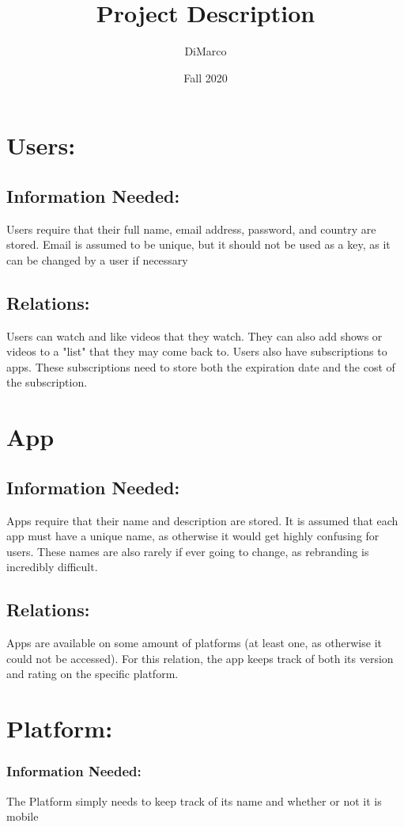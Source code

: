 \documentclass{neu_handout}
\title{Project Description}
\author{DiMarco}
\date{Fall 2020}
\begin{document}
\section{Users:}

\subsection{Information Needed:}
Users require that their full name, email address, password, and country are stored. Email is assumed to be unique, but it should not be used as a key, as it can be changed by a user if necessary

\subsection{Relations:}
Users can watch and like videos that they watch. They can also add shows or videos to a "list" that they may come back to. Users also have subscriptions to apps. These subscriptions need to store both the expiration date and the cost of the subscription.


\section{App}

\subsection{Information Needed:}
Apps require that their name and description are stored. It is assumed that each app must have a unique name, as otherwise it would get highly confusing for users. These names are also rarely if ever going to change, as rebranding is incredibly difficult.


\subsection{Relations:}
Apps are available on some amount of platforms (at least one, as otherwise it could not be accessed). For this relation, the app keeps track of both its version and rating on the specific platform.

\section{Platform:}

\subsubsection{Information Needed:}
The Platform simply needs to keep track of its name and whether or not it is mobile
\end{document}
